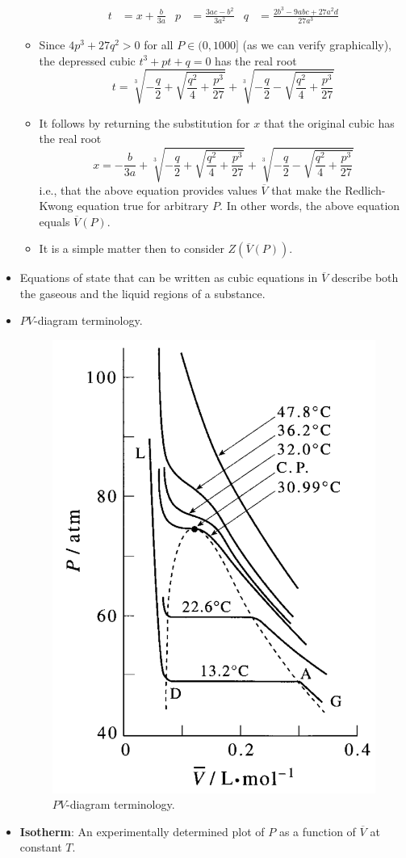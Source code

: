 \documentclass[../notes.tex]{subfiles}
\begin{document}
\begin{itemize}
\begin{itemize}
        \begin{align*}
            t &= x+\frac{b}{3a}&
            p &= \frac{3ac-b^2}{3a^2}&
            q &= \frac{2b^3-9abc+27a^2d}{27a^3}
        \end{align*}
        \item Since $4p^3+27q^2>0$ for all $P\in(0,1000]$ (as we can verify graphically), the depressed cubic $t^3+pt+q=0$ has the real root
        \begin{equation*}
            t = \sqrt[3]{-\frac{q}{2}+\sqrt{\frac{q^2}{4}+\frac{p^3}{27}}}+\sqrt[3]{-\frac{q}{2}-\sqrt{\frac{q^2}{4}+\frac{p^3}{27}}}
        \end{equation*}
        \item It follows by returning the substitution for $x$ that the original cubic has the real root
        \begin{equation*}
            x = -\frac{b}{3a}+\sqrt[3]{-\frac{q}{2}+\sqrt{\frac{q^2}{4}+\frac{p^3}{27}}}+\sqrt[3]{-\frac{q}{2}-\sqrt{\frac{q^2}{4}+\frac{p^3}{27}}}
        \end{equation*}
        i.e., that the above equation provides values $\overline{V}$ that make the Redlich-Kwong equation true for arbitrary $P$. In other words, the above equation equals $\overline{V}(P)$.
        \item It is a simple matter then to consider $Z(\overline{V}(P))$.
    \end{itemize}
    \item {}Equations of state that can be written as cubic equations in $\overline{V}$ describe both the gaseous and the liquid regions of a substance.
    \item $PV$-diagram terminology.
    \begin{figure}[h!]
        \centering
        \includegraphics[width=0.28\linewidth]{../ExtFiles/PVterms.png}
        \caption{$PV$-diagram terminology.}
        \label{fig:PVterms}
    \end{figure}
    \item \textbf{Isotherm}: An experimentally determined plot of $P$ as a function of $\overline{V}$ at constant $T$.

\end{itemize}
\end{document}
